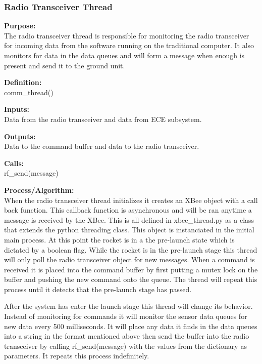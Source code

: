\documentclass[10pt,draftclsnofoot,onecolumn,compsoc]{IEEEtran}
\begin{document}
\subsubsection{Radio Transceiver Thread}
{\bf Purpose:} \\
The radio transceiver thread is responsible for monitoring the radio transceiver for incoming data from the software running on the traditional computer. It also monitors for data in the data queues and will form a message when enough is present and send it to the ground unit. \par
{\bf Definition:} \\ 
comm\_thread() \par
{\bf Inputs:} \\  Data from the radio transceiver and data from ECE subsystem. \par
{\bf Outputs:} \\ Data to the command buffer and data to the radio transceiver. \par
{\bf Calls:} \\ rf\_send(message) \par
{\bf Process/Algorithm:} \\
When the radio transceiver thread initializes it creates an XBee object with a call back function. This callback function is asynchronous and will be ran anytime a message is received by the XBee. This is all defined in xbee\_thread.py as a class that extends the python threading class. This object is instanciated in the initial main process. At this point the rocket is in a the pre-launch state which is dictated by a boolean flag. While the rocket is in the pre-launch stage this thread will only poll the radio transceiver object for new messages. When a command is received it is placed into the command buffer by first putting a mutex lock on the buffer and pushing the new command onto the queue. The thread will repeat this process until it detects that the pre-launch stage has passed.  \par
After the system has enter the launch stage this thread will change its behavior. Instead of monitoring for commands it will monitor the sensor data queues for new data every 500 milliseconds. It will place any data it finds in the data queues into a string in the format mentioned above then send the buffer into the radio transceiver by calling rf\_send(message) with the values from the dictionary as parameters. It repeats this process indefinitely. \par
\end{document}
